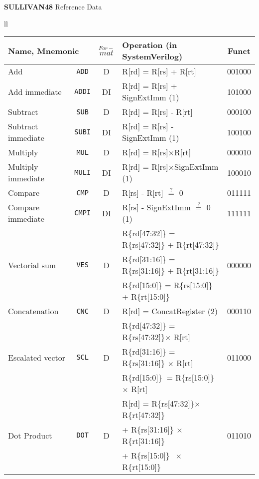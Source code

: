 \documentclass[a4paper,landscape]{article}
\begin{document}
	\def\stackalignment{l}
	 \textbf{\Large SULLIVAN48  } {\large Reference Data}
	\begin{table}[H]
		\begin{tabular}{ll}
		\begin{adjustbox}{max width=0.8\textwidth}
		\begin{tabular}{lcclc}\hline
			\multicolumn{2}{l}{Name, Mnemonic}&$\stackrel{For-}{mat}$&Operation (in SystemVerilog)& Funct \\\hline
			Add & \texttt{ADD} & D & R[rd] = R[rs] + R[rt] & 001000 \\
			Add immediate & \texttt{ADDI} & DI & R[rd] = R[rs] + SignExtImm \hfill (1) & 101000 \\
			Subtract & \texttt{SUB} & D & R[rd] = R[rs] - R[rt] & 000100 \\
			Subtract immediate & \texttt{SUBI} & DI & R[rd] = R[rs] - SignExtImm \hfill (1)& 100100 \\
			Multiply & \texttt{MUL} & D & R[rd] = R[rs]$\times$R[rt] & 000010 \\
			Multiply immediate & \texttt{MULI}& DI & R[rd] = R[rs]$\times$SignExtImm \hfill (1)& 100010 \\
			Compare & \texttt{CMP} & D & R[rs] - R[rt] $\stackrel{?}{=}$ 0 & 011111\\
			Compare immediate & \texttt{CMPI} & DI & R[rs] - SignExtImm $\stackrel{?}{=}$ 0 \hfill (1) & 111111\\
			
			&&&R\{rd[47:32]\} = R\{rs[47:32]\} + R\{rt[47:32]\}& \\
			Vectorial sum &\texttt{VES}&D&R\{rd[31:16]\} = R\{rs[31:16]\} + R\{rt[31:16]\}& 000000 \\
			&&&R\{rd[15:0]\} = R\{rs[15:0]\} + R\{rt[15:0]\}& \\
			
			Concatenation & \texttt{CNC} & D & R[rd] = ConcatRegister \hfill (2)& 000110 \\
			
			&&&R\{rd[47:32]\} = R\{rs[47:32]\}$\times$ R[rt]& \\
			Escalated vector &\texttt{SCL}&D&R\{rd[31:16]\} = R\{rs[31:16]\} $\times$  R[rt]& 011000 \\
			&&&R\{rd[15:0]\}$~$ = R\{rs[15:0]\} $\times$  R[rt]& \\
			
			&&&R[rd] = R\{rs[47:32]\}$\times$R\{rt[47:32]\}& \\
			Dot Product &\texttt{DOT}&D&\hspace{0.7cm}+ R\{rs[31:16]\} $\times$   R\{rt[31:16]\}& 011010 \\
			&&&\hspace{0.7cm}+ R\{rs[15:0]\} $~\times$  R\{rt[15:0]\}& \\
			

\end{tabular}
\end{adjustbox}
\end{tabular}
\end{table}
\end{document}
